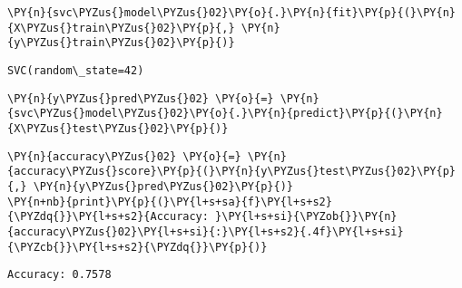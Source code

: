     \begin{tcolorbox}[breakable, size=fbox, boxrule=1pt, pad at break*=1mm,colback=cellbackground, colframe=cellborder]
\begin{Verbatim}[commandchars=\\\{\}]
\PY{n}{svc\PYZus{}model\PYZus{}02}\PY{o}{.}\PY{n}{fit}\PY{p}{(}\PY{n}{X\PYZus{}train\PYZus{}02}\PY{p}{,} \PY{n}{y\PYZus{}train\PYZus{}02}\PY{p}{)}
\end{Verbatim}
\end{tcolorbox}

            \begin{tcolorbox}[breakable, size=fbox, boxrule=.5pt, pad at break*=1mm, opacityfill=0]
\begin{Verbatim}[commandchars=\\\{\}]
SVC(random\_state=42)
\end{Verbatim}
\end{tcolorbox}
        
    \begin{tcolorbox}[breakable, size=fbox, boxrule=1pt, pad at break*=1mm,colback=cellbackground, colframe=cellborder]
\begin{Verbatim}[commandchars=\\\{\}]
\PY{n}{y\PYZus{}pred\PYZus{}02} \PY{o}{=} \PY{n}{svc\PYZus{}model\PYZus{}02}\PY{o}{.}\PY{n}{predict}\PY{p}{(}\PY{n}{X\PYZus{}test\PYZus{}02}\PY{p}{)}
\end{Verbatim}
\end{tcolorbox}

    \begin{tcolorbox}[breakable, size=fbox, boxrule=1pt, pad at break*=1mm,colback=cellbackground, colframe=cellborder]
\begin{Verbatim}[commandchars=\\\{\}]
\PY{n}{accuracy\PYZus{}02} \PY{o}{=} \PY{n}{accuracy\PYZus{}score}\PY{p}{(}\PY{n}{y\PYZus{}test\PYZus{}02}\PY{p}{,} \PY{n}{y\PYZus{}pred\PYZus{}02}\PY{p}{)}
\PY{n+nb}{print}\PY{p}{(}\PY{l+s+sa}{f}\PY{l+s+s2}{\PYZdq{}}\PY{l+s+s2}{Accuracy: }\PY{l+s+si}{\PYZob{}}\PY{n}{accuracy\PYZus{}02}\PY{l+s+si}{:}\PY{l+s+s2}{.4f}\PY{l+s+si}{\PYZcb{}}\PY{l+s+s2}{\PYZdq{}}\PY{p}{)}
\end{Verbatim}
\end{tcolorbox}

    \begin{Verbatim}[commandchars=\\\{\}]
Accuracy: 0.7578
    \end{Verbatim}


